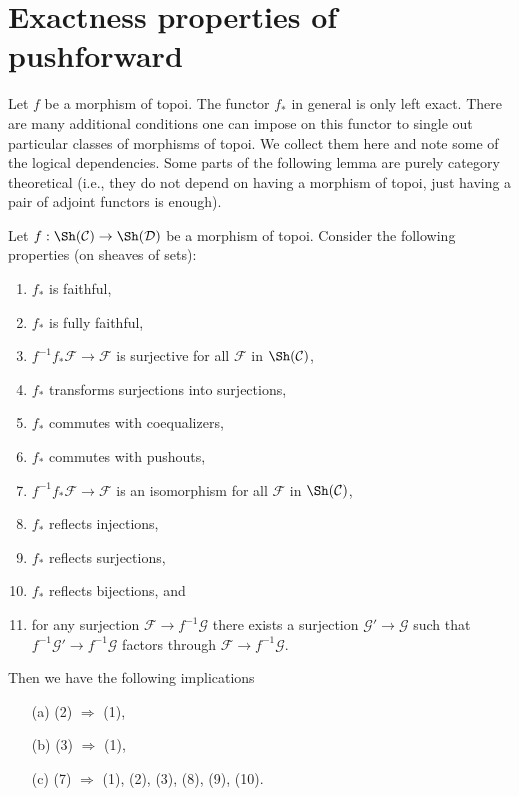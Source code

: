 \section{Exactness properties of pushforward}
\label{section-pushforward}

\noindent
Let $f$ be a morphism of topoi. The functor $f_*$ in general is only
left exact. There are many additional conditions one can impose on this
functor to single out particular classes of morphisms of topoi.
We collect them here and note some of the logical dependencies.
Some parts of the following lemma are purely category theoretical (i.e.,
they do not depend on having a morphism of topoi, just having a pair
of adjoint functors is enough).

\begin{lemma}
\label{lemma-exactness-properties}
Let $f : \Sh(\mathcal{C}) \to \Sh(\mathcal{D})$ be
a morphism of topoi. Consider the following properties (on sheaves
of sets):
\begin{enumerate}
\item $f_*$ is faithful,
\item $f_*$ is fully faithful,
\item $f^{-1}f_*\mathcal{F} \to \mathcal{F}$ is surjective for
all $\mathcal{F}$ in $\Sh(\mathcal{C})$,
\item $f_*$ transforms surjections into surjections,
\item $f_*$ commutes with coequalizers,
\item $f_*$ commutes with pushouts,
\item $f^{-1}f_*\mathcal{F} \to \mathcal{F}$ is an isomorphism for
all $\mathcal{F}$ in $\Sh(\mathcal{C})$,
\item $f_*$ reflects injections,
\item $f_*$ reflects surjections,
\item $f_*$ reflects bijections, and
\item for any surjection $\mathcal{F} \to f^{-1}\mathcal{G}$ there
exists a surjection $\mathcal{G}' \to \mathcal{G}$ such that
$f^{-1}\mathcal{G}' \to f^{-1}\mathcal{G}$ factors through
$\mathcal{F} \to f^{-1}\mathcal{G}$.
\end{enumerate}
Then we have the following implications
\begin{enumerate}
\item[(a)] (2) $\Rightarrow$ (1),
\item[(b)] (3) $\Rightarrow$ (1),
\item[(c)] (7) $\Rightarrow$ (1), (2), (3), (8), (9), (10).

\end{enumerate}
\end{lemma}
